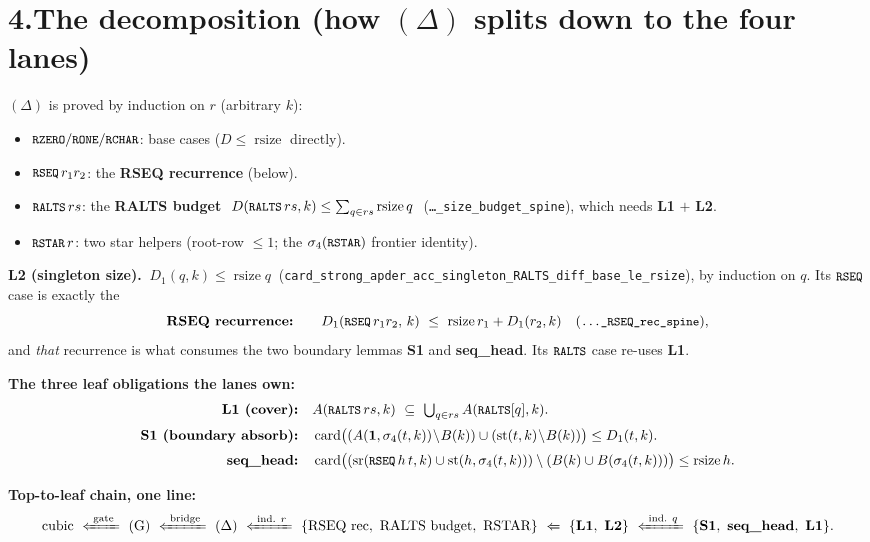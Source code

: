\documentclass[11pt]{article}
\newcommand{\rsz}{\operatorname{rsize}}
\newcommand{\card}{\operatorname{card}}
\newcommand{\sfour}{\sigma_4}
\newcommand{\Aacc}{A}
\newcommand{\Bbase}{B}
\newcommand{\Dexc}{D}
\newcommand{\sr}{\operatorname{sr}}
\newcommand{\st}{\operatorname{st}}
\newcommand{\one}{\mathbf{1}}
\newcommand{\code}[1]{\texttt{\small #1}}
\begin{document}
\section*{4.\quad The decomposition (how $(\Delta)$ splits down to the four lanes)}
$(\Delta)$ is proved by induction on $r$ (arbitrary $k$):
\begin{itemize}
\item $\code{RZERO}/\code{RONE}/\code{RCHAR}$: base cases ($\Dexc\le \rsz$ directly).
\item $\code{RSEQ}\,r_1 r_2$: the \textbf{RSEQ recurrence} (below).
\item $\code{RALTS}\,rs$: the \textbf{RALTS budget} $\ \Dexc(\code{RALTS}\,rs,k)\le \sum_{q\in rs}\rsz q\ $
      (\code{\dots\_size\_budget\_spine}), which needs \textbf{L1} $+$ \textbf{L2}.
\item $\code{RSTAR}\,r$: two star helpers (root-row $\le 1$; the $\sfour(\code{RSTAR})$ frontier identity).
\end{itemize}

\textbf{L2 (singleton size).} $\ \boxed{\Dexc_1(q,k)\le \rsz q}\ $ (\code{card\_strong\_apder\_acc\_singleton\_RALTS\_diff\_base\_le\_rsize}),
by induction on $q$. Its $\code{RSEQ}$ case is exactly the
\[
\textbf{RSEQ recurrence:}\qquad \Dexc_1(\code{RSEQ}\,r_1 r_2,\,k)\ \le\ \rsz r_1+\Dexc_1(r_2,k)
\quad(\code{\dots\_RSEQ\_rec\_spine}),
\]
and \emph{that} recurrence is what consumes the two boundary lemmas \textbf{S1} and \textbf{seq\_head}. Its
$\code{RALTS}$ case re-uses \textbf{L1}.

\medskip
\textbf{The three leaf obligations the lanes own:}
\[
\begin{aligned}
\textbf{L1 (cover):}\quad & \Aacc(\code{RALTS}\,rs,k)\ \subseteq\ \textstyle\bigcup_{q\in rs}\Aacc(\code{RALTS}[q],k).\\[2pt]
\textbf{S1 (boundary absorb):}\quad & \card\!\big((\Aacc(\one,\sfour(t,k))\!\setminus\!\Bbase(k))\cup(\st(t,k)\!\setminus\!\Bbase(k))\big)\le \Dexc_1(t,k).\\[2pt]
\textbf{seq\_head:}\quad & \card\!\big((\sr(\code{RSEQ}\,h\,t,k)\cup\st(h,\sfour(t,k)))\setminus(\Bbase(k)\cup\Bbase(\sfour(t,k)))\big)\le \rsz h.
\end{aligned}
\]

\medskip
\textbf{Top-to-leaf chain, one line:}
\[
\text{cubic}\ \xLeftarrow{\;\text{gate}\;}\ (\mathrm{G})\ \xLeftarrow{\;\text{bridge}\;}\ (\Delta)\ \xLeftarrow{\;\text{ind. }r\;}\ \{\text{RSEQ rec},\ \text{RALTS budget},\ \text{RSTAR}\}\ \xLeftarrow{}\ \{\textbf{L1},\ \textbf{L2}\}\ \xLeftarrow{\;\text{ind. }q\;}\ \{\textbf{S1},\ \textbf{seq\_head},\ \textbf{L1}\}.
\]
\end{document}
